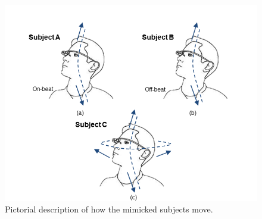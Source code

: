 




\begin{figure}
\centering
\includegraphics[width = .75\columnwidth]{figure/imitation_subject_movement.png}
\caption{\label{fig:imitation_movement} Pictorial description of how the mimicked subjects move.}
\end{figure}

 